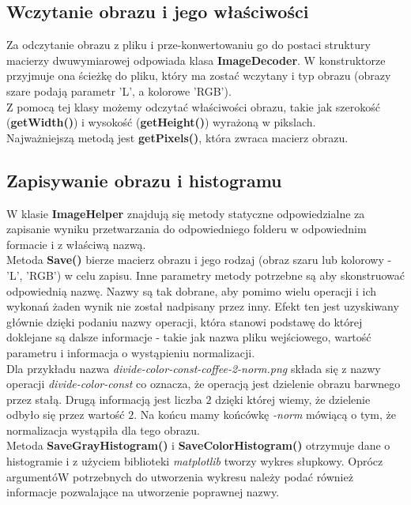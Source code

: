 \documentclass[a4paper,12pt]{book}
\begin{document}
\subsection*{Wczytanie obrazu i jego właściwości}
Za odczytanie obrazu z pliku i prze-konwertowaniu go do postaci struktury macierzy dwuwymiarowej odpowiada klasa \textbf{ImageDecoder}. W konstruktorze przyjmuje ona ścieżkę do pliku, który ma zostać wczytany i typ obrazu (obrazy szare podają parametr 'L', a kolorowe 'RGB'). \\
Z pomocą tej klasy możemy odczytać właściwości obrazu, takie jak szerokość (\textbf{getWidth()}) i wysokość (\textbf{getHeight()}) wyrażoną w pikslach. \\
Najważniejszą metodą jest \textbf{getPixels()}, która zwraca macierz obrazu. 

\subsection*{Zapisywanie obrazu i histogramu}
W klasie \textbf{ImageHelper} znajdują się metody statyczne odpowiedzialne za zapisanie wyniku przetwarzania do odpowiedniego folderu w odpowiednim formacie i z właściwą nazwą. \\
Metoda \textbf{Save()} bierze macierz obrazu i jego rodzaj (obraz szaru lub kolorowy - 'L', 'RGB') w celu zapisu. Inne parametry metody potrzebne są aby skonstruować odpowiednią nazwę. Nazwy są tak dobrane, aby pomimo wielu operacji i ich wykonań żaden wynik nie został nadpisany przez inny. Efekt ten jest uzyskiwany głównie dzięki podaniu nazwy operacji, która stanowi podstawę do której doklejane są dalsze informacje - takie jak nazwa pliku wejściowego, wartość parametru i informacja o wystąpieniu normalizacji. \\
Dla przykładu nazwa \textit{divide-color-const-coffee-2-norm.png} składa się z nazwy operacji \textit{divide-color-const} co oznacza, że operacją jest dzielenie obrazu barwnego przez stałą. Drugą informacją jest liczba $2$ dzięki której wiemy, że dzielenie odbyło się przez wartość $2$. Na końcu mamy końcówkę \textit{-norm} mówiącą o tym, że normalizacja wystąpiła dla tego obrazu. \\
Metoda \textbf{SaveGrayHistogram()} i \textbf{SaveColorHistogram()} otrzymuje dane o histogramie i z użyciem biblioteki \textit{matplotlib} tworzy wykres słupkowy. Oprócz argumentóW potrzebnych do utworzenia wykresu należy podać również informacje pozwalające na utworzenie poprawnej nazwy. 
\end{document}
